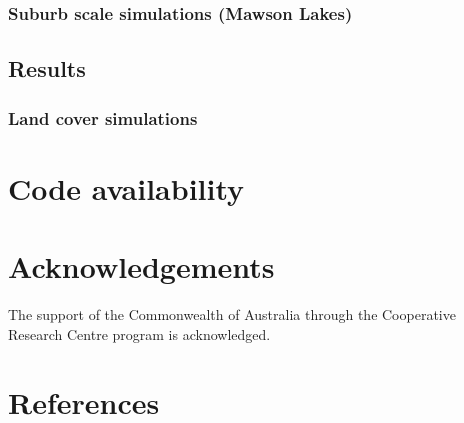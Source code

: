 \documentclass[final,3p,times,authoryear]{elsarticle}
\begin{document}
\subsubsection{Suburb scale simulations (Mawson Lakes)}\label{sec:suburbsim} 
 

\subsection{Results}\label{sec:Results} 
\subsubsection{Land cover simulations}\label{sec:landcoverresult} 






































\section{Code availability}\label{sec:available}

\printglossary[title={List of Symbols}]

\section*{Acknowledgements}
The support of the Commonwealth of Australia through the Cooperative Research Centre program is acknowledged.

\section*{References}\label{sec:ref}
   
  
\end{document}
